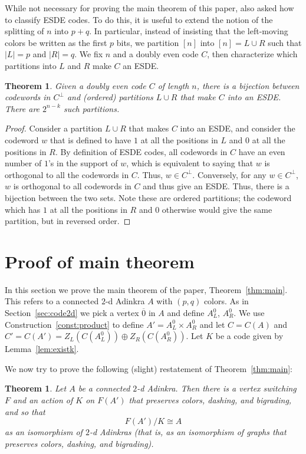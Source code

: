 \documentclass[12pt,twoside,singlespace]{article}
\numberwithin{equation}{section}
\newtheorem{thm}[equation]{Theorem}
\theoremstyle{definition}
\begin{document}
While not necessary for proving the main theorem of this paper, \cite{hubsch:weaving} also asked how to classify ESDE codes.  To do this, it is useful to extend the notion of the splitting of $n$ into $p+q$.  In particular, instead of insisting that the left-moving colors be written as the first $p$ bits, we partition $[n]$ into $[n]=L\cup R$ such that $|L|=p$ and $|R|=q$.  We fix $n$ and a doubly even code $C$, then characterize which partitions into $L$ and $R$ make $C$ an ESDE.

\begin{thm}
\label{thm:esdeclassify}
Given a doubly even code $C$ of length $n$, there is a bijection between codewords in $C^\perp$ and (ordered) partitions $L \cup R$ that make $C$ into an ESDE. There are $2^{n-k}$ such partitions. 
\end{thm}
\begin{proof}
Consider a partition $L \cup R$ that makes $C$ into an ESDE, and consider the codeword $w$ that is defined to have $1$ at all the positions in $L$ and $0$ at all the positions in $R$.  By definition of ESDE codes, all codewords in $C$ have an even number of $1$'s in the support of $w$, which is equivalent to saying that $w$ is orthogonal to all the codewords in $C$. Thus, $w \in C^\perp$.  Conversely, for any $w \in C^\perp$, $w$ is orthogonal to all codewords in $C$ and thus give an ESDE. Thus, there is a bijection between the two sets.  Note these are ordered partitions; the codeword which has $1$ at all the positions in $R$ and $0$ otherwise would give the same partition, but in reversed order.
\end{proof}

\section{Proof of main theorem}
\label{sec:quotient}
In this section we prove the main theorem of the paper, Theorem~\ref{thm:main}.  This refers to a connected $2$-d Adinkra $A$ with $(p,q)$ colors.  As in Section~\ref{sec:code2d} we pick a vertex $\overline{0}$ in $A$ and define $A_L^0$, $A_R^0$.  We use Construction~\ref{const:product} to define $A'=A_L^0\times A_R^0$ and let $C=C(A)$ and $C'=C(A')=Z_L(C(A_L^0))\oplus Z_R(C(A_R^0))$.  Let $K$ be a code given by Lemma~\ref{lem:existk}.

We now try to prove the following (slight) restatement of Theorem~\ref{thm:main}:
\begin{thm}
\label{thm:quotient}
Let $A$ be a connected $2$-d Adinkra.  Then there is a vertex switching $F$ and an action of $K$ on $F(A')$ that preserves colors, dashing, and bigrading, and so that
\[F(A')/K\cong A\]
as an isomorphism of $2$-d Adinkras (that is, as an isomorphism of graphs that preserves colors, dashing, and bigrading).
\end{thm}
\end{document}

